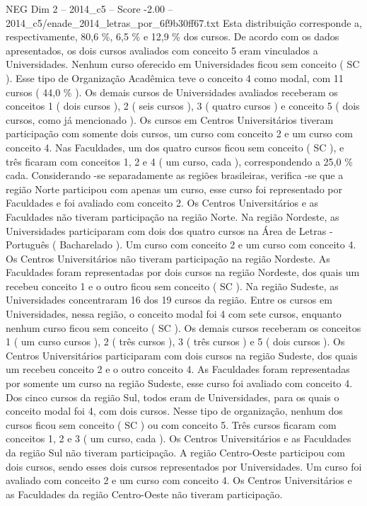 \begin{textsample}{NEG Dim 2 – 2014\_c5 – Score -2.00 – 2014\_c5/enade\_2014\_letras\_por\_6f9b30ff67.txt}
Esta distribuição corresponde a, respectivamente, 80,6 \%, 6,5 \% e 12,9 \% dos cursos.
De acordo com os dados apresentados, os dois cursos avaliados com conceito 5 eram vinculados a Universidades.
Nenhum curso oferecido em Universidades ficou sem conceito ( SC ).
Esse tipo de Organização Acadêmica teve o conceito 4 como modal, com 11 cursos ( 44,0 \% ).
Os demais cursos de Universidades avaliados receberam os conceitos 1 ( dois cursos ), 2 ( seis cursos ), 3 ( quatro cursos ) e conceito 5 ( dois cursos, como já mencionado ).
Os cursos em Centros Universitários tiveram participação com somente dois cursos, um curso com conceito 2 e um curso com conceito 4.
Nas Faculdades, um dos quatro cursos ficou sem conceito ( SC ), e três ficaram com conceitos 1, 2 e 4 ( um curso, cada ), correspondendo a 25,0 \% cada.
Considerando -se separadamente as regiões brasileiras, verifica -se que a região Norte participou com apenas um curso, esse curso foi representado por Faculdades e foi avaliado com conceito 2.
Os Centros Universitários e as Faculdades não tiveram participação na região Norte.
Na região Nordeste, as Universidades participaram com dois dos quatro cursos na Área de Letras - Português ( Bacharelado ).
Um curso com conceito 2 e um curso com conceito 4.
Os Centros Universitários não tiveram participação na região Nordeste.
As Faculdades foram representadas por dois cursos na região Nordeste, dos quais um recebeu conceito 1 e o outro ficou sem conceito ( SC ).
Na região Sudeste, as Universidades concentraram 16 dos 19 cursos da região.
Entre os cursos em Universidades, nessa região, o conceito modal foi 4 com sete cursos, enquanto nenhum curso ficou sem conceito ( SC ).
Os demais cursos receberam os conceitos 1 ( um curso cursos ), 2 ( três cursos ), 3 ( três cursos ) e 5 ( dois cursos ).
Os Centros Universitários participaram com dois cursos na região Sudeste, dos quais um recebeu conceito 2 e o outro conceito 4.
As Faculdades foram representadas por somente um curso na região Sudeste, esse curso foi avaliado com conceito 4.
Dos cinco cursos da região Sul, todos eram de Universidades, para os quais o conceito modal foi 4, com dois cursos.
Nesse tipo de organização, nenhum dos cursos ficou sem conceito ( SC ) ou com conceito 5.
Três cursos ficaram com conceitos 1, 2 e 3 ( um curso, cada ).
Os Centros Universitários e as Faculdades da região Sul não tiveram participação.
A região Centro-Oeste participou com dois cursos, sendo esses dois cursos representados por Universidades.
Um curso foi avaliado com conceito 2 e um curso com conceito 4.
Os Centros Universitários e as Faculdades da região Centro-Oeste não tiveram participação.

\end{textsample}
